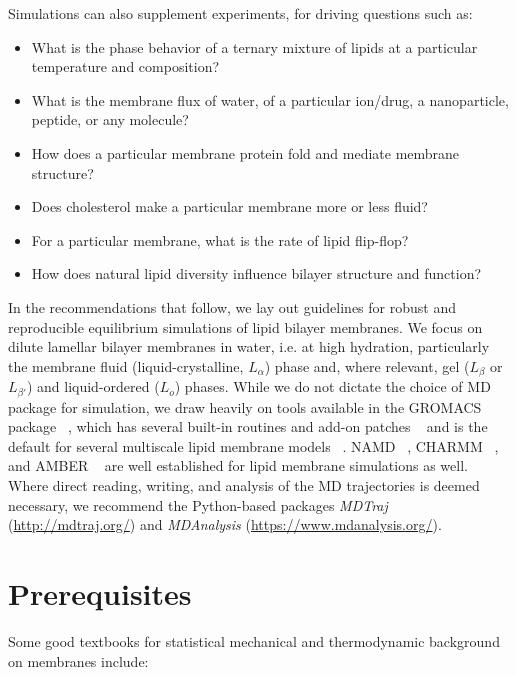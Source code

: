 \documentclass[9pt,bestpractices,pubversion]{livecoms}
\begin{document}
Simulations can also supplement experiments, for driving questions such as:

\begin{itemize}
	\item What is the phase behavior of a ternary mixture of lipids at a particular temperature  and composition?
	\item What is the membrane flux of water, of a particular ion/drug, a nanoparticle, peptide, or any molecule?
	\item How does a particular membrane protein fold and mediate membrane structure?
	\item Does cholesterol make a particular membrane more or less fluid?
	\item For a particular membrane, what is the rate of lipid flip-flop?
	\item How does natural lipid diversity influence bilayer structure and function?
\end{itemize}

In the recommendations that follow, we lay out guidelines for robust and reproducible equilibrium simulations of lipid bilayer membranes.
We focus on dilute lamellar bilayer membranes in water, i.e. at high hydration, particularly the membrane fluid (liquid-crystalline, $L_\alpha$) phase and, where relevant, gel ($L_\beta$ or $L_{\beta '}$) and liquid-ordered ($L_o$) phases.
While we do not dictate the choice of MD package for simulation, we draw heavily on tools available in the GROMACS package ~\cite{VanDerSpoel2005}, which has several built-in routines and add-on patches  ~\cite{Buchoux2017,Lukat2013,Truhlar2009a} and is the default for several multiscale lipid membrane models ~\cite{Poger2010a,Jambeck2012,Marrink2004,Marrink2007a,Arnarez2015}.
NAMD ~\cite{Phillips2005}, CHARMM ~\cite{Gumbart2007}, and AMBER ~\cite{Case2018} are well established for lipid membrane simulations as well.
Where direct reading, writing, and analysis of the MD trajectories is deemed necessary, we recommend the Python-based packages \textit{MDTraj} (\url{http://mdtraj.org/}) and \textit{MDAnalysis} (\url{https://www.mdanalysis.org/}).


\section{Prerequisites}
\label{sec:prereq}
Some good textbooks for statistical mechanical and thermodynamic background on membranes include:
\end{document}
